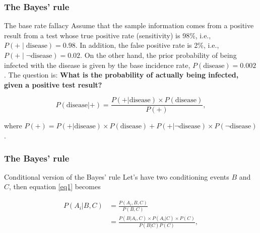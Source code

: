 \documentclass[12pt, compress]{beamer}
\begin{document}
\begin{frame}
	\frametitle{The Bayes' rule}
	\begin{block}{The base rate fallacy}
		Assume that the sample information comes from a positive result from a test whose true positive rate (sensitivity) is 98\%, i.e., \( P(+ \mid \text{disease}) = 0.98 \). In addition, the false positive rate is 2\%, i.e., \( P(+ \mid \lnot\text{disease}) = 0.02 \). On the other hand, the prior probability of being infected with the disease is given by the base incidence rate, \( P(\text{disease}) = 0.002 \). The question is: \textbf{What is the probability of actually being infected, given a positive test result?}		
	\end{block}
	\begin{equation*}
	P(\text{disease}|+) = \frac{P(+|\text{disease})\times P(\text{disease})}{P(+)},
	\end{equation*}
	
	where $P(+)=P(+|\text{disease})\times P(\text{disease})+P(+|\lnot\text{disease})\times P( \lnot\text{disease})$.
	
\end{frame}

\begin{frame}
	\frametitle{The Bayes' rule}
	
	\begin{block}{Conditional version of the Bayes' rule}
	Let's have two conditioning events $B$ and $C$, then equation \ref{eq1} becomes		
	\end{block}

	\begin{align*}
	P(A_i|B,C)&=\frac{P(A_i,B,C)}{P(B,C)}\\
		&=\frac{P(B|A_i,C) \times P(A_i|C) \times P(C)}{P(B|C)P(C)},
	\end{align*}
	
\end{frame}
\end{document}
